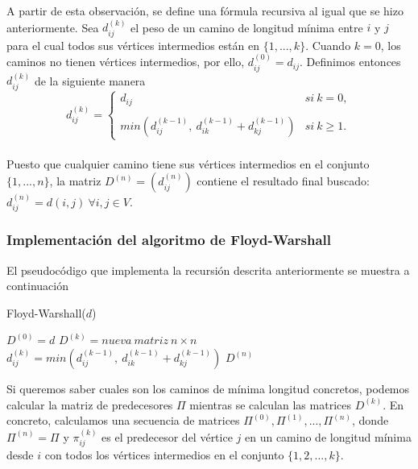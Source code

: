 A partir de esta observación, se define una fórmula recursiva al igual que se hizo anteriormente. Sea $d_{ij}^{(k)}$ el peso de un camino de longitud mínima entre $i$ y $j$ para el cual todos sus vértices intermedios están en $\{1,...,k\}$. Cuando $k=0$, los caminos no tienen vértices intermedios, por ello, $d_{ij}^{(0)}=d_{ij}$. Definimos entonces $d_{ij}^{(k)}$ de la siguiente manera \\

$$d_{ij}^{(k)}= \left\{ \begin{array}{lcc}
	d_{ij} &   si\ k=0, \\
	\\ min(d_{ij}^{(k-1)},\ d_{ik}^{(k-1)}+d_{kj}^{(k-1)}) & si\ k\geq 1.
\end{array}
\right.$$ \\

Puesto que cualquier camino tiene sus vértices intermedios en el conjunto $\{1,...,n\}$, la matriz $D^{(n)}=(d_{ij}^{(n)})$ contiene el resultado final buscado: $d_{ij}^{(n)}=d(i,j)\ \forall i,j\in V.$

\subsubsection{Implementación del algoritmo de Floyd-Warshall}

El pseudocódigo que implementa la recursión descrita anteriormente se muestra a continuación

\begin{breakablealgorithm}
	\caption{Floyd-Warshall($d$)}
	\begin{algorithmic}[1]
		\State $D^{(0)}=d$
			\State $D^{(k)}=nueva\ matriz\ n\times n$
					\State $d_{ij}^{(k)}=min(d_{ij}^{(k-1)},\ d_{ik}^{(k-1)}+d_{kj}^{(k-1)})$
				\EndFor
			\EndFor
		\EndFor
		\Return $D^{(n)}$
	\end{algorithmic}
\end{breakablealgorithm}

Si queremos saber cuales son los caminos de mínima longitud concretos, podemos calcular la matriz de predecesores $\Pi$ mientras se calculan las matrices $D^{(k)}$. En concreto, calculamos una secuencia de matrices $\Pi^{(0)},\Pi^{(1)},...,\Pi^{(n)}$, donde $\Pi^{(n)}=\Pi$ y $\pi_{ij}^{(k)}$ es el predecesor del vértice $j$ en un camino de longitud mínima desde $i$ con todos los vértices intermedios en el conjunto $\{1,2,...,k\}$. \\

